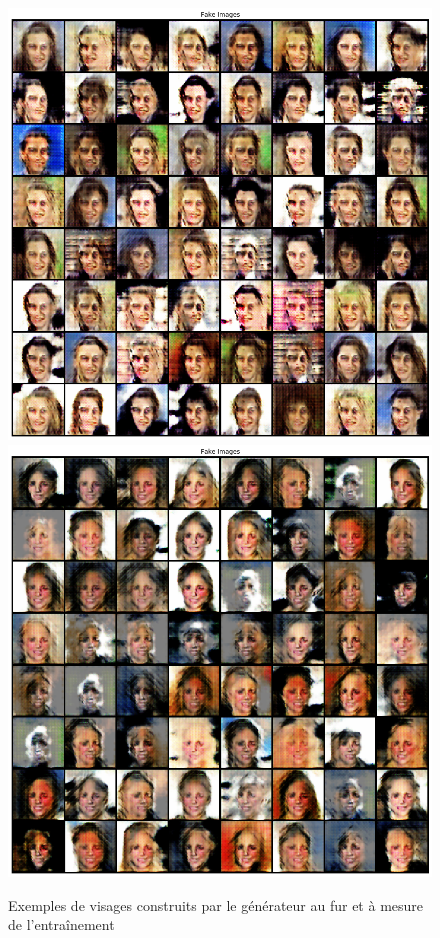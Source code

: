 \documentclass{standalone}
\begin{document}
\begin{figure}[H]
		\includegraphics[scale=0.2]{img/faces4.png}
		\includegraphics[scale=0.2]{img/faces5.png}
		\caption{Exemples de visages construits par le générateur au fur et à mesure de l'entraînement}
		\label{vae:samples}
	\end{figure}
\end{document}
